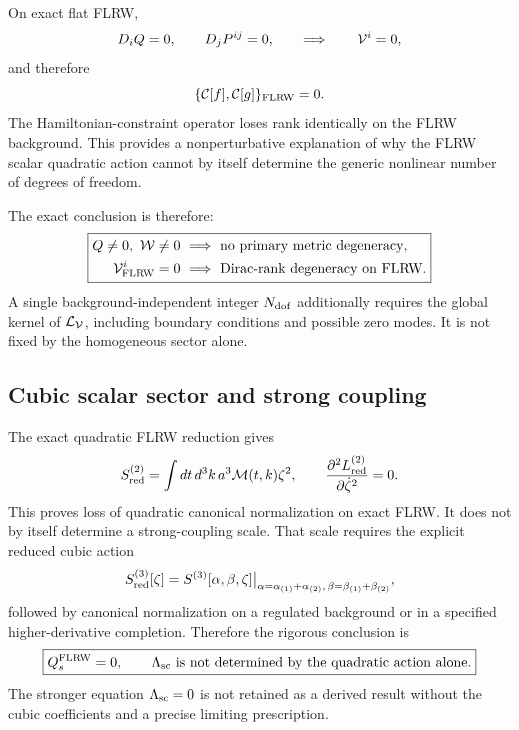 \documentclass[11pt,a4paper]{article}
\begin{document}
On exact flat FLRW,
\begin{equation}
 D_iQ=0,\qquad D_jP^{ij}=0,
 \qquad\Longrightarrow\qquad {\cal V}^i=0,
\end{equation}
and therefore
\begin{equation}
 \{{\cal C}[f],{\cal C}[g]\}_{\rm FLRW}=0 .
\end{equation}
The Hamiltonian-constraint operator loses rank identically on the FLRW
background.  This provides a nonperturbative explanation of why the FLRW scalar
quadratic action cannot by itself determine the generic nonlinear number of
degrees of freedom.

The exact conclusion is therefore:
\begin{equation}
 \boxed{\begin{aligned}
 Q\neq0,\ {\cal W}\neq0
 &\ \Longrightarrow\ \text{no primary metric degeneracy},\\
 {\cal V}^i_{\rm FLRW}=0
 &\ \Longrightarrow\ \text{Dirac-rank degeneracy on FLRW}.
 \end{aligned}}
\end{equation}
A single background-independent integer \(N_{\rm dof}\) additionally requires
the global kernel of \({\cal L}_{\cal V}\), including boundary conditions and
possible zero modes.  It is not fixed by the homogeneous sector alone.

\subsection{Cubic scalar sector and strong coupling}

The exact quadratic FLRW reduction gives
\begin{equation}
 S_{\rm red}^{(2)}
 =\int dt\,d^3k\,a^3{\cal M}(t,k)\zeta^2,
 \qquad
 \frac{\partial^2L_{\rm red}^{(2)}}{\partial\dot\zeta^2}=0.
\end{equation}
This proves loss of quadratic canonical normalization on exact FLRW.
It does not by itself determine a strong-coupling scale.  That scale requires
the explicit reduced cubic action
\begin{equation}
 S_{\rm red}^{(3)}[\zeta]
 =
 S^{(3)}[\alpha,\beta,\zeta]\big|_{\alpha=\alpha_{(1)}+\alpha_{(2)},
 \,\beta=\beta_{(1)}+\beta_{(2)}},
\end{equation}
followed by canonical normalization on a regulated background or in a specified
higher-derivative completion.  Therefore the rigorous conclusion is
\begin{equation}
 \boxed{Q_s^{\rm FLRW}=0,\qquad
 \Lambda_{\rm sc}\ \text{is not determined by the quadratic action alone}.}
\end{equation}
The stronger equation \(\Lambda_{\rm sc}=0\) is not retained as a derived
result without the cubic coefficients and a precise limiting prescription.
\end{document}
